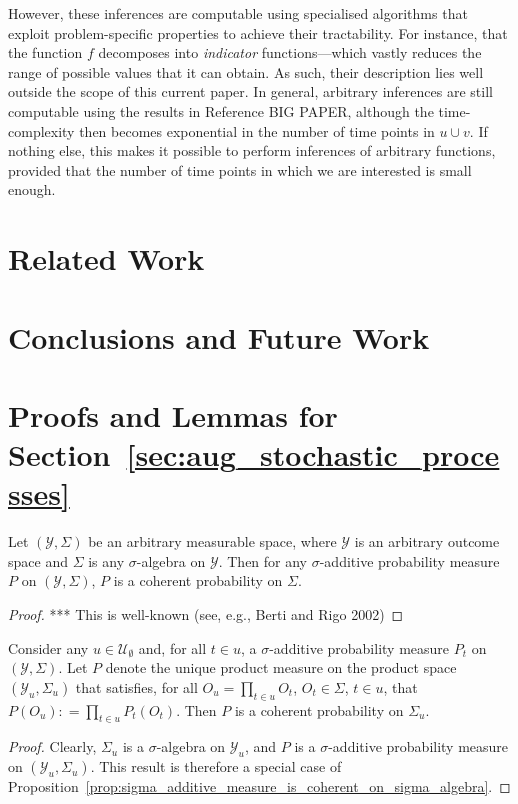 \documentclass[twoside,11pt]{article}
\newcommand{\observs}{\mathcal{Y}}
\newcommand{\coloneqq}{:\!=}
\begin{document}
However, these inferences are computable using specialised algorithms that exploit problem-specific properties to achieve their tractability. For instance, that the function $f$ decomposes into \emph{indicator} functions---which vastly reduces the range of possible values that it can obtain. As such, their description lies well outside the scope of this current paper. In general, arbitrary inferences are still computable using the results in Reference BIG PAPER, although the time-complexity then becomes exponential in the number of time points in $u\cup v$. If nothing else, this makes it possible to perform inferences of arbitrary functions, provided that the number of time points in which we are interested is small enough.

\section{Related Work}

\section{Conclusions and Future Work}




\newpage

\appendix


\section{Proofs and Lemmas for Section~\ref{sec:aug_stochastic_processes}}

\begin{proposition}\label{prop:sigma_additive_measure_is_coherent_on_sigma_algebra}
Let $(\observs,\Sigma)$ be an arbitrary measurable space, where $\observs$ is an arbitrary outcome space and $\Sigma$ is any $\sigma$-algebra on $\observs$. Then for any $\sigma$-additive probability measure $P$ on $(\observs,\Sigma)$, $P$ is a coherent probability on $\Sigma$.
\end{proposition}
\begin{proof}
*** This is well-known (see, e.g., Berti and Rigo 2002)
\end{proof}

\begin{corollary}\label{cor:product_measure_is_coherent}
Consider any $u\in\mathcal{U}_\emptyset$ and, for all $t\in u$, a $\sigma$-additive probability measure $P_t$ on $(\observs,\Sigma)$. Let $P$ denote the unique product measure on the product space $(\observs_u,\Sigma_u)$ that satisfies, for all $O_u=\prod_{t\in u} O_t$, $O_t\in\Sigma$, $t\in u$, that $P(O_u)\coloneqq \prod_{t\in u}P_t(O_t)$. Then $P$ is a coherent probability on $\Sigma_u$.
\end{corollary}
\begin{proof}
Clearly, $\Sigma_u$ is a $\sigma$-algebra on $\observs_u$, and $P$ is a $\sigma$-additive probability measure on $(\observs_u,\Sigma_u)$. This result is therefore a special case of Proposition~\ref{prop:sigma_additive_measure_is_coherent_on_sigma_algebra}.
\end{proof}
\end{document}
